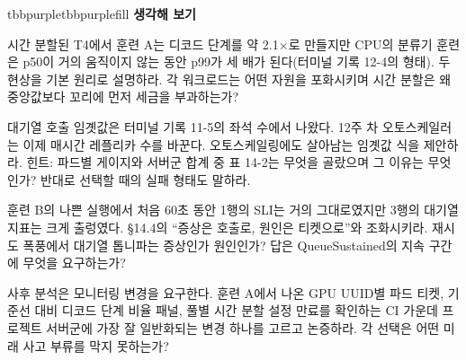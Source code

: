\begin{calloutbox}{tbbpurple}{tbbpurplefill}
{\normalsize\bfseries\color{tbbpurple}생각해 보기}\par\vspace{3pt}
\begin{tbbitemize}
  \item 시간 분할된 T4에서 훈련 A는 디코드 단계를 약 2.1×로 만들지만 CPU의 분류기 훈련은 p50이 거의 움직이지 않는 동안 p99가 세 배가 된다(터미널 기록 12-4의 형태). 두 현상을 기본 원리로 설명하라. 각 워크로드는 어떤 자원을 포화시키며 시간 분할은 왜 중앙값보다 꼬리에 먼저 세금을 부과하는가?
  \item 대기열 호출 임곗값은 터미널 기록 11-5의 좌석 수에서 나왔다. 12주 차 오토스케일러는 이제 매시간 레플리카 수를 바꾼다. 오토스케일링에도 살아남는 임곗값 식을 제안하라. 힌트: 파드별 게이지와 서버군 합계 중 표 14-2는 무엇을 골랐으며 그 이유는 무엇인가? 반대로 선택할 때의 실패 형태도 말하라.
  \item 훈련 B의 나쁜 실행에서 처음 60초 동안 1행의 SLI는 거의 그대로였지만 3행의 대기열 지표는 크게 출렁였다. §14.4의 “증상은 호출로, 원인은 티켓으로”와 조화시키라. 재시도 폭풍에서 대기열 톱니파는 증상인가 원인인가? 답은 QueueSustained의 지속 구간에 무엇을 요구하는가?
  \item 사후 분석은 모니터링 변경을 요구한다. 훈련 A에서 나온 GPU UUID별 파드 티켓, 기준선 대비 디코드 단계 비율 패널, 풀별 시간 분할 설정 만료를 확인하는 CI 가운데 프로젝트 서버군에 가장 잘 일반화되는 변경 하나를 고르고 논증하라. 각 선택은 어떤 미래 사고 부류를 막지 못하는가?
\end{tbbitemize}
\end{calloutbox}




